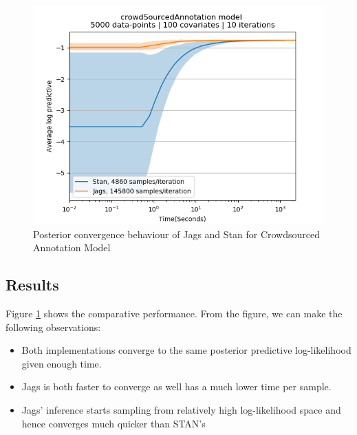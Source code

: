 \documentclass[../main.tex]{subfiles}
\begin{document}
\begin{figure}[h]
  \centering
  \includegraphics[width=150mm]{../figures/analysis_crowdsourced_annotation.png}
  \caption{Posterior convergence behaviour of Jags and Stan for Crowdsourced Annotation Model}
  \label{fig:fig2}
\end{figure}

\subsection{Results}
Figure \ref{fig:fig2} shows the comparative performance.
From the figure, we can make the following observations:
\begin{itemize}
\item Both implementations converge to the same posterior predictive log-likelihood given enough time.
\item Jags is both faster to converge as well has a much lower time per sample.
\item Jags' inference starts sampling from relatively high log-likelihood space  and hence converges much quicker than STAN's
\end{itemize}



\end{document}
